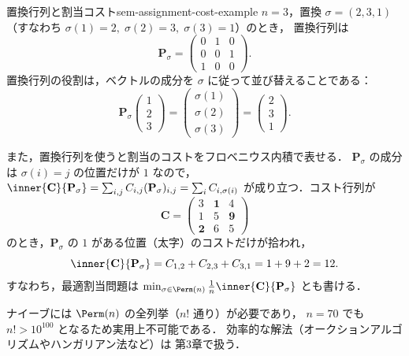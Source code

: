 \begin{example}{置換行列と割当コスト}{sem-assignment-cost-example}
  $n = 3$，置換 $\sigma = (2, 3, 1)$
  （すなわち $\sigma(1) = 2,\; \sigma(2) = 3,\; \sigma(3) = 1$）のとき，
  置換行列は
  \[
    \mathbf{P}_\sigma =
    \begin{pmatrix}
      0 & 1 & 0 \\
      0 & 0 & 1 \\
      1 & 0 & 0
    \end{pmatrix}.
  \]
  置換行列の役割は，ベクトルの成分を $\sigma$ に従って並び替えることである：
  \[
    \mathbf{P}_\sigma
    \begin{pmatrix} 1 \\ 2 \\ 3 \end{pmatrix}
    =
    \begin{pmatrix} \sigma(1) \\ \sigma(2) \\ \sigma(3) \end{pmatrix}
    =
    \begin{pmatrix} 2 \\ 3 \\ 1 \end{pmatrix}.
  \]

  \medskip
  また，置換行列を使うと割当のコストをフロベニウス内積で表せる．
  $\mathbf{P}_\sigma$ の成分は $\sigma(i) = j$ の位置だけが $1$ なので，
  $\inner{\mathbf{C}}{\mathbf{P}_\sigma}
  = \sum_{i,j} C_{i,j} (\mathbf{P}_\sigma)_{i,j}
  = \sum_{i} C_{i,\sigma(i)}$
  が成り立つ．コスト行列が
  \[
    \mathbf{C} =
    \begin{pmatrix}
      3 & \mathbf{1} & 4 \\
      1 & 5 & \mathbf{9} \\
      \mathbf{2} & 6 & 5
    \end{pmatrix}
  \]
  のとき，$\mathbf{P}_\sigma$ の $1$ がある位置（太字）のコストだけが拾われ，
  \[
    \inner{\mathbf{C}}{\mathbf{P}_\sigma}
    = C_{1,2} + C_{2,3} + C_{3,1}
    = 1 + 9 + 2 = 12.
  \]
  すなわち，最適割当問題は
  $\min_{\sigma \in \Perm(n)} \frac{1}{n}\inner{\mathbf{C}}{\mathbf{P}_\sigma}$
  とも書ける．
\end{example}

ナイーブには $\Perm(n)$ の全列挙（$n!$ 通り）が必要であり，
$n = 70$ でも $n! > 10^{100}$ となるため実用上不可能である．
効率的な解法（オークションアルゴリズムやハンガリアン法など）は
第3章で扱う．

